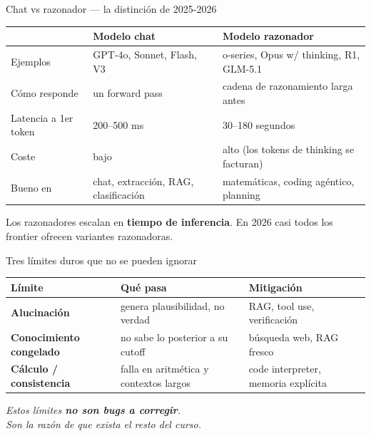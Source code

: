 \documentclass[aspectratio=169,11pt]{beamer}
\newcommand{\hl}[1]{\textcolor{mBlue}{\textbf{#1}}}
\begin{document}
\begin{frame}{Chat vs razonador — la distinción de 2025-2026}
  \small
  \begin{center}
  \renewcommand{\arraystretch}{1.2}
  \begin{tabular}{@{}p{3.3cm} p{5cm} p{5cm}@{}}
    \toprule
     & \textbf{Modelo chat} & \textbf{Modelo razonador} \\
    \midrule
    Ejemplos & GPT-4o, Sonnet, Flash, V3 & o-series, Opus w/ thinking, R1, GLM-5.1 \\
    Cómo responde & un forward pass & cadena de razonamiento larga antes \\
    Latencia a 1er token & 200--500 ms & 30--180 segundos \\
    Coste & bajo & alto (los tokens de thinking se facturan) \\
    Bueno en & chat, extracción, RAG, clasificación & matemáticas, coding agéntico, planning \\
    \bottomrule
  \end{tabular}
  \end{center}

  \vspace{0.4cm}
  \begin{center}
    \begin{minipage}{0.85\textwidth}\centering
      \small Los razonadores escalan en \textbf{tiempo de inferencia}. En 2026 casi todos los\\frontier ofrecen variantes razonadoras.
    \end{minipage}
  \end{center}
\end{frame}

\begin{frame}{Tres límites duros que no se pueden ignorar}
  \small
  \begin{center}
  \renewcommand{\arraystretch}{1.35}
  \begin{tabular}{@{}p{3.8cm} p{5cm} p{4.4cm}@{}}
    \toprule
    \textbf{Límite} & \textbf{Qué pasa} & \textbf{Mitigación} \\
    \midrule
    \hl{Alucinación} & genera plausibilidad, no verdad & RAG, tool use, verificación \\
    \hl{Conocimiento congelado} & no sabe lo posterior a su cutoff & búsqueda web, RAG fresco \\
    \hl{Cálculo / consistencia} & falla en aritmética y contextos largos & code interpreter, memoria explícita \\
    \bottomrule
  \end{tabular}
  \end{center}

  \vspace{0.6cm}
  \begin{center}
    \begin{minipage}{0.85\textwidth}\centering
      \textcolor{mBlue}{\textit{Estos límites \textbf{no son bugs a corregir}.\\Son la razón de que exista el resto del curso.}}
    \end{minipage}
  \end{center}
\end{frame}
\end{document}
